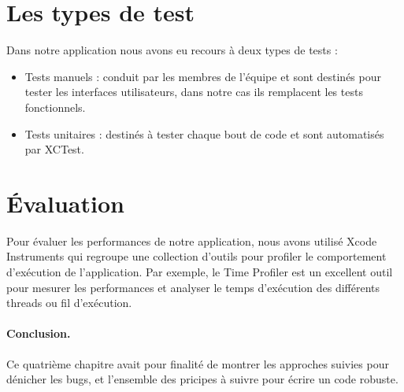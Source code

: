 \section{Les types de test} %
\label{sub:tests}
Dans notre application nous avons eu recours à deux types de tests :
\begin{itemize}
	\item Tests manuels : conduit par les membres de l'équipe et sont destinés pour tester les interfaces utilisateurs, dans notre cas ils remplacent les tests fonctionnels.
	\item Tests unitaires : destinés à tester chaque bout de code et sont automatisés par XCTest.
\end{itemize}

\section{Évaluation} %
Pour évaluer les performances de notre application, nous avons utilisé Xcode Instruments qui regroupe une collection d'outils pour profiler le comportement d'exécution de l’application. Par exemple, le Time Profiler est un excellent outil pour mesurer les performances et analyser le temps d'exécution des différents threads ou fil d’exécution.\clearpage
{}

\paragraph{Conclusion.} %
\label{par:conclusion}
Ce quatrième chapitre avait pour finalité de montrer les approches suivies pour dénicher les bugs, et l'ensemble des pricipes à suivre pour écrire un code robuste.\cite{tdd}
